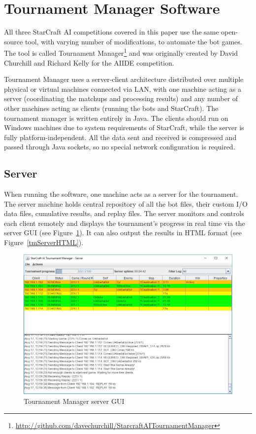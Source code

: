 \section{Tournament Manager Software}\label{secTournamentManagerSoftware}

All three StarCraft AI competitions covered in this paper use the same open-source tool, with varying number of modifications, to automate the bot games. The tool is called Tournament Manager\footnote{\url{http://github.com/davechurchill/StarcraftAITournamentManager}} and was originally created by David Churchill and Richard Kelly for the AIIDE competition. 

Tournament Manager uses a server-client architecture distributed over multiple physical or virtual machines connected via LAN, with one machine acting as a server (coordinating the matchups and processing results) and any number of other machines acting as clients (running the bots and StarCraft). The tournament manager is written entirely in Java. The clients should run on Windows machines due to system requirements of StarCraft, while the server is fully platform-independent. All the data sent and received is compressed and passed through Java sockets, so no special network configuration is required.

\subsection{Server}

When running the software, one machine acts as a server for the tournament. The server machine holds central repository of all the bot files, their custom I/O data files, cumulative results, and replay files. The server monitors and controls each client remotely and displays the tournament's progress in real time via the server GUI (see Figure~\ref{tmServerGUI}). It can also output the results in HTML format (see Figure~\ref{tmServerHTML}).

\begin{figure}[h]
  \centering
  \includegraphics[width=1\columnwidth]{fig/tournament-manager-screenshot.png}
  \caption{Tournament Manager server GUI}
  \label{tmServerGUI}
\end{figure}

